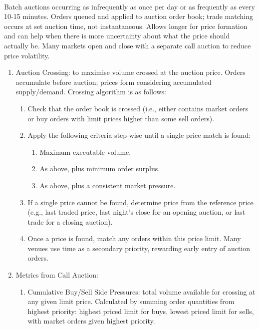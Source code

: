\begin{definition} \\
Batch auctions occurring as infrequently as once per day or as frequently as every 10-15 minutes. Orders queued and applied to auction order book; trade matching occurs at set auction time, not instantaneous. Allows longer for price formation and can help when there is more uncertainty about what the price should actually be. Many markets open and close with a separate call auction to reduce price volatility.
\begin{enumerate}[label=\roman*.]
\setlength{\itemsep}{0pt}
\item Auction Crossing: to maximise volume crossed at the auction price. Orders accumulate before auction; prices form considering accumulated supply/demand. Crossing algorithm is as follows:
\begin{enumerate}[label=\arabic*.]
\setlength{\itemsep}{0pt}
\item Check that the order book is crossed (i.e., either contains market orders or buy orders with limit prices higher than some sell orders).
\item Apply the following criteria step-wise until a single price match is found:
\begin{enumerate}[label=\alph*.]
\setlength{\itemsep}{0pt}
\item Maximum executable volume.
\item As above, plus minimum order surplus.
\item As above, plus a consistent market pressure.
\end{enumerate}
\item If a single price cannot be found, determine price from the reference price (e.g., last traded price, last night's close for an opening auction, or last trade for a closing auction).
\item Once a price is found, match any orders within this price limit. Many venues use time as a secondary priority, rewarding early entry of auction orders.
\end{enumerate}
\item Metrics from Call Auction:
\begin{enumerate}[label=\arabic*.]
\setlength{\itemsep}{0pt}
\item Cumulative Buy/Sell Side Pressures: total volume available for crossing at any given limit price. Calculated by summing order quantities from highest priority: highest priced limit for buys, lowest priced limit for sells, with market orders given highest priority.

\end{enumerate}
\end{enumerate}
\end{definition}
